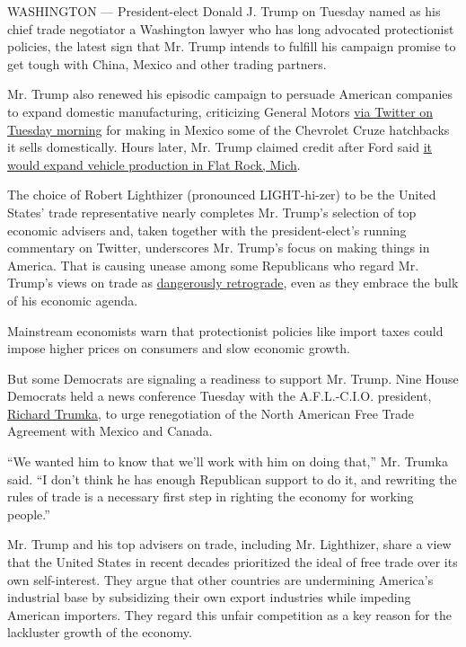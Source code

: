 WASHINGTON --- President-elect Donald J. Trump on Tuesday named as his
chief trade negotiator a Washington lawyer who has long advocated
protectionist policies, the latest sign that Mr. Trump intends to
fulfill his campaign promise to get tough with China, Mexico and other
trading partners.

Mr. Trump also renewed his episodic campaign to persuade American
companies to expand domestic manufacturing, criticizing General Motors
\href{https://twitter.com/realDonaldTrump/status/816260343391514624}{via
Twitter on Tuesday morning} for making in Mexico some of the Chevrolet
Cruze hatchbacks it sells domestically. Hours later, Mr. Trump claimed
credit after Ford said
\href{http://www.nytimes.com/2017/01/03/business/ford-general-motors-trump.html?hp\&action=click\&pgtype=Homepage\&clickSource=story-heading\&module=first-column-region\&region=top-news\&WT.nav=top-news}{it
would expand vehicle production in Flat Rock, Mich}.

The choice of Robert Lighthizer (pronounced LIGHT-hi-zer) to be the
United States' trade representative nearly completes Mr. Trump's
selection of top economic advisers and, taken together with the
president-elect's running commentary on Twitter, underscores Mr. Trump's
focus on making things in America. That is causing unease among some
Republicans who regard Mr. Trump's views on trade as
\href{http://www.nytimes.com/2016/03/11/us/politics/-trade-donald-trump-breaks-200-years-economic-orthodoxy-mercantilism.html}{dangerously
retrograde}, even as they embrace the bulk of his economic agenda.

Mainstream economists warn that protectionist policies like import taxes
could impose higher prices on consumers and slow economic growth.

But some Democrats are signaling a readiness to support Mr. Trump. Nine
House Democrats held a news conference Tuesday with the A.F.L.-C.I.O.
president,
\href{https://www.nytimes.com/2016/12/27/opinion/dont-let-trump-speak-for-workers.html?_r=0}{Richard
Trumka}, to urge renegotiation of the North American Free Trade
Agreement with Mexico and Canada.

``We wanted him to know that we'll work with him on doing that,'' Mr.
Trumka said. ``I don't think he has enough Republican support to do it,
and rewriting the rules of trade is a necessary first step in righting
the economy for working people.''

Mr. Trump and his top advisers on trade, including Mr. Lighthizer, share
a view that the United States in recent decades prioritized the ideal of
free trade over its own self-interest. They argue that other countries
are undermining America's industrial base by subsidizing their own
export industries while impeding American importers. They regard this
unfair competition as a key reason for the lackluster growth of the
economy.

